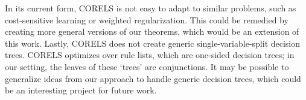 \begin{arxiv}
In its current form, CORELS is not easy to adapt to similar problems,
such as cost-sensitive learning or weighted regularization.
%
This could be remedied by creating more general versions of our theorems,
which would be an extension of this work.
%
Lastly, CORELS does not create generic single-variable-split decision trees.
%
CORELS optimizes over rule lists, which are one-sided decision trees;
in our setting, the leaves of these `trees' are conjunctions.
%
It may be possible to generalize ideas from our approach to handle generic
decision trees, which could be an interesting project for future work.
\end{arxiv}
